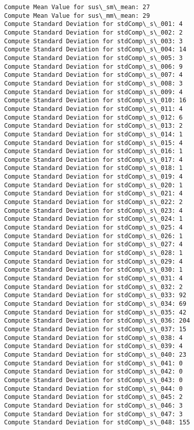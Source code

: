 \documentclass[11pt]{article}
\begin{document}
    \begin{Verbatim}[commandchars=\\\{\}]
Compute Mean Value for sus\_sm\_mean: 27
Compute Mean Value for sus\_mm\_mean: 29
Compute Standard Deviation for stdComp\_s\_001: 4
Compute Standard Deviation for stdComp\_s\_002: 2
Compute Standard Deviation for stdComp\_s\_003: 3
Compute Standard Deviation for stdComp\_s\_004: 14
Compute Standard Deviation for stdComp\_s\_005: 3
Compute Standard Deviation for stdComp\_s\_006: 9
Compute Standard Deviation for stdComp\_s\_007: 4
Compute Standard Deviation for stdComp\_s\_008: 3
Compute Standard Deviation for stdComp\_s\_009: 4
Compute Standard Deviation for stdComp\_s\_010: 16
Compute Standard Deviation for stdComp\_s\_011: 4
Compute Standard Deviation for stdComp\_s\_012: 6
Compute Standard Deviation for stdComp\_s\_013: 2
Compute Standard Deviation for stdComp\_s\_014: 1
Compute Standard Deviation for stdComp\_s\_015: 4
Compute Standard Deviation for stdComp\_s\_016: 1
Compute Standard Deviation for stdComp\_s\_017: 4
Compute Standard Deviation for stdComp\_s\_018: 1
Compute Standard Deviation for stdComp\_s\_019: 4
Compute Standard Deviation for stdComp\_s\_020: 1
Compute Standard Deviation for stdComp\_s\_021: 4
Compute Standard Deviation for stdComp\_s\_022: 2
Compute Standard Deviation for stdComp\_s\_023: 4
Compute Standard Deviation for stdComp\_s\_024: 1
Compute Standard Deviation for stdComp\_s\_025: 4
Compute Standard Deviation for stdComp\_s\_026: 1
Compute Standard Deviation for stdComp\_s\_027: 4
Compute Standard Deviation for stdComp\_s\_028: 1
Compute Standard Deviation for stdComp\_s\_029: 4
Compute Standard Deviation for stdComp\_s\_030: 1
Compute Standard Deviation for stdComp\_s\_031: 4
Compute Standard Deviation for stdComp\_s\_032: 2
Compute Standard Deviation for stdComp\_s\_033: 92
Compute Standard Deviation for stdComp\_s\_034: 69
Compute Standard Deviation for stdComp\_s\_035: 42
Compute Standard Deviation for stdComp\_s\_036: 204
Compute Standard Deviation for stdComp\_s\_037: 15
Compute Standard Deviation for stdComp\_s\_038: 4
Compute Standard Deviation for stdComp\_s\_039: 4
Compute Standard Deviation for stdComp\_s\_040: 23
Compute Standard Deviation for stdComp\_s\_041: 0
Compute Standard Deviation for stdComp\_s\_042: 0
Compute Standard Deviation for stdComp\_s\_043: 0
Compute Standard Deviation for stdComp\_s\_044: 0
Compute Standard Deviation for stdComp\_s\_045: 2
Compute Standard Deviation for stdComp\_s\_046: 3
Compute Standard Deviation for stdComp\_s\_047: 3
Compute Standard Deviation for stdComp\_s\_048: 155

\end{Verbatim}
\end{document}
